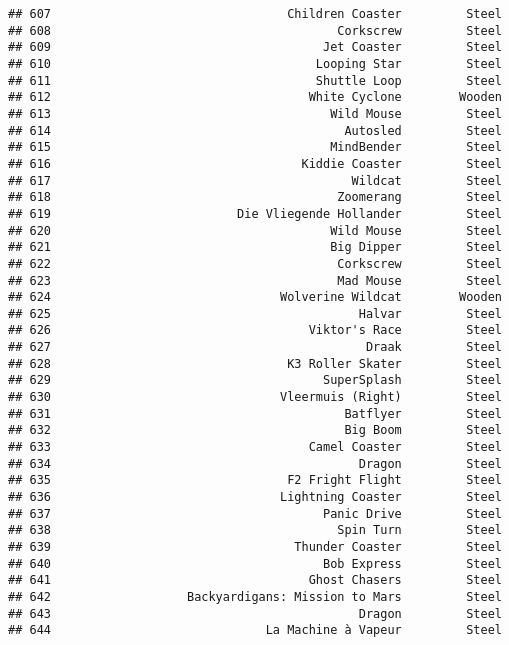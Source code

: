 \documentclass[
]{article}
\begin{document}
\begin{verbatim}
## 607                                 Children Coaster         Steel
## 608                                        Corkscrew         Steel
## 609                                      Jet Coaster         Steel
## 610                                     Looping Star         Steel
## 611                                     Shuttle Loop         Steel
## 612                                    White Cyclone        Wooden
## 613                                       Wild Mouse         Steel
## 614                                         Autosled         Steel
## 615                                       MindBender         Steel
## 616                                   Kiddie Coaster         Steel
## 617                                          Wildcat         Steel
## 618                                        Zoomerang         Steel
## 619                          Die Vliegende Hollander         Steel
## 620                                       Wild Mouse         Steel
## 621                                       Big Dipper         Steel
## 622                                        Corkscrew         Steel
## 623                                        Mad Mouse         Steel
## 624                                Wolverine Wildcat        Wooden
## 625                                           Halvar         Steel
## 626                                    Viktor's Race         Steel
## 627                                            Draak         Steel
## 628                                 K3 Roller Skater         Steel
## 629                                      SuperSplash         Steel
## 630                                Vleermuis (Right)         Steel
## 631                                         Batflyer         Steel
## 632                                         Big Boom         Steel
## 633                                    Camel Coaster         Steel
## 634                                           Dragon         Steel
## 635                                 F2 Fright Flight         Steel
## 636                                Lightning Coaster         Steel
## 637                                      Panic Drive         Steel
## 638                                        Spin Turn         Steel
## 639                                  Thunder Coaster         Steel
## 640                                      Bob Express         Steel
## 641                                    Ghost Chasers         Steel
## 642                   Backyardigans: Mission to Mars         Steel
## 643                                           Dragon         Steel
## 644                              La Machine à Vapeur         Steel

\end{verbatim}
\end{document}
